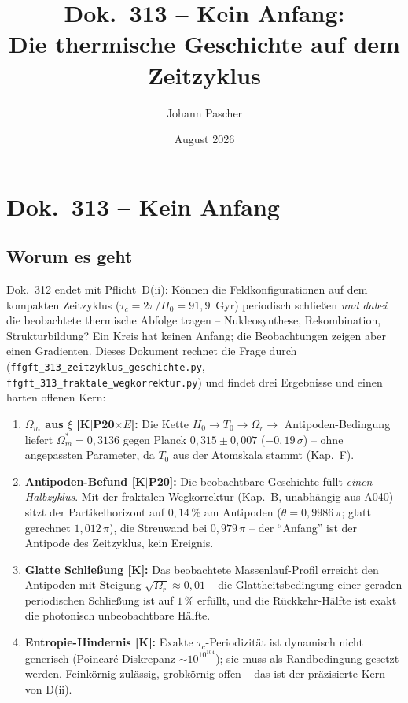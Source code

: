 \documentclass[11pt]{report}
\title{Dok.~313 -- Kein Anfang:\\
Die thermische Geschichte auf dem Zeitzyklus}
\author{Johann Pascher}
\date{August 2026}
\begin{document}
\maketitle
\tableofcontents

\chapter*{Dok.~313 -- Kein Anfang}

\section*{Worum es geht}

Dok.~312 endet mit Pflicht~D(ii): Können die Feldkonfigurationen
auf dem kompakten Zeitzyklus ($\tau_c = 2\pi/H_0 = 91{,}9$~Gyr)
periodisch schließen \emph{und dabei} die beobachtete thermische
Abfolge tragen -- Nukleosynthese, Rekombination, Strukturbildung?
Ein Kreis hat keinen Anfang; die Beobachtungen zeigen aber einen
Gradienten. Dieses Dokument rechnet die Frage durch
(\texttt{ffgft\_313\_zeitzyklus\_geschichte.py},
\texttt{ffgft\_313\_fraktale\_wegkorrektur.py}) und findet drei
Ergebnisse und einen harten offenen Kern:

\begin{enumerate}
  \item \textbf{$\Omega_m$ aus $\xi$ [K$|$P20$\times E$]:} Die
        Kette $H_0 \to T_0 \to \Omega_r \to$ Antipoden-Bedingung
        liefert $\Omega_m^{*} = 0{,}3136$ gegen Planck
        $0{,}315\pm0{,}007$ ($-0{,}19\,\sigma$) -- ohne
        angepassten Parameter, da $T_0$ aus der Atomskala
        stammt (Kap.~F).
  \item \textbf{Antipoden-Befund [K$|$P20]:} Die beobachtbare
        Geschichte füllt \emph{einen Halbzyklus}. Mit der
        fraktalen Wegkorrektur (Kap.~B, unabhängig aus A040)
        sitzt der Partikelhorizont auf $0{,}14\,\%$ am Antipoden
        ($\theta = 0{,}9986\,\pi$; glatt gerechnet
        $1{,}012\,\pi$), die Streuwand bei $0{,}979\,\pi$ --
        der \enquote{Anfang} ist der Antipode des Zeitzyklus,
        kein Ereignis.
  \item \textbf{Glatte Schließung [K]:} Das beobachtete
        Massenlauf-Profil erreicht den Antipoden mit Steigung
        $\sqrt{\Omega_r} \approx 0{,}01$ -- die
        Glattheitsbedingung einer geraden periodischen Schließung
        ist auf $1\,\%$ erfüllt, und die Rückkehr-Hälfte ist exakt
        die photonisch unbeobachtbare Hälfte.
  \item \textbf{Entropie-Hindernis [K]:} Exakte
        $\tau_c$-Periodizität ist dynamisch nicht generisch
        (Poincaré-Diskrepanz $\sim 10^{10^{104}}$); sie muss als
        Randbedingung gesetzt werden. Feinkörnig zulässig,
        grobkörnig offen -- das ist der präzisierte Kern von
        D(ii).
\end{enumerate}
\end{document}
